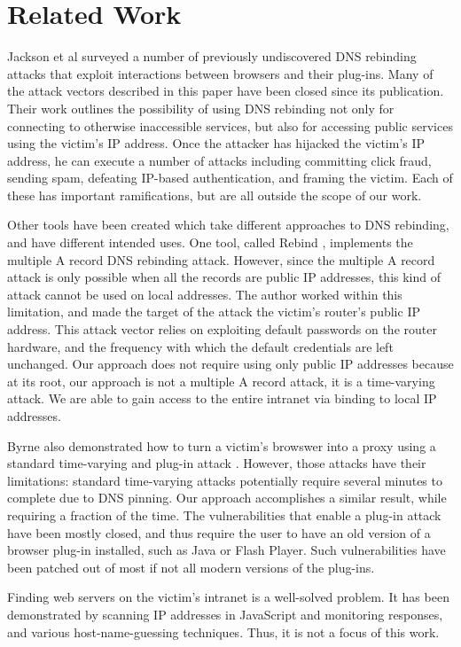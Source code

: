 \section{Related Work}
\label{sec:related}


Jackson et al \cite{protectFromDNS} surveyed a number of previously undiscovered DNS rebinding attacks that exploit interactions between browsers and their plug-ins. Many of the attack vectors described in this paper have been closed since its publication. Their work outlines the possibility of using DNS rebinding not only for connecting to otherwise inaccessible services, but also for accessing public services using the victim's IP address. Once the attacker has hijacked the victim's IP address, he can execute a number of attacks including committing click fraud, sending spam, defeating IP-based authentication, and framing the victim. Each of these has important ramifications, but are all outside the scope of our work.

Other tools have been created which take different approaches to DNS rebinding, and have different intended uses. One tool, called Rebind \cite{rebind}, implements the multiple A record DNS rebinding attack. However, since the multiple A record attack is only possible when all the records are public IP addresses, this kind of attack cannot be used on local addresses. The author worked within this limitation, and made the target of the attack the victim's router's public IP address. This attack vector relies on exploiting default passwords on the router hardware, and the frequency with which the default credentials are left unchanged. Our approach does not require using only public IP addresses because at its root, our approach is not a multiple A record attack, it is a time-varying attack.  We are able to gain access to the entire intranet via binding to local IP addresses.

Byrne also demonstrated how to turn a victim's browswer into a proxy using a standard time-varying and plug-in attack \cite{blackhat}. However, those attacks have their limitations: standard time-varying attacks potentially require several minutes to complete due to DNS pinning. Our approach accomplishes a similar result, while requiring a fraction of the time. The vulnerabilities that enable a plug-in attack have been mostly closed, and thus require the user to have an old version of a browser plug-in installed, such as Java or Flash Player. Such vulnerabilities have been patched out of most if not all modern versions of the plug-ins.

Finding web servers on the victim's intranet is a well-solved problem. It has been demonstrated by scanning IP addresses in JavaScript and monitoring responses\cite{grossman}, and various host-name-guessing techniques\cite{protectFromDNS}. Thus, it is not a focus of this work.


